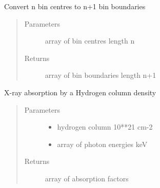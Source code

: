 \documentclass[letterpaper,10pt,english]{sphinxmanual}
\begin{document}
\begin{fulllineitems}
\end{fulllineitems}


\begin{fulllineitems}
\label{\detokenize{astro_functions:astro.ctob}}
Convert n bin centres to n+1 bin boundaries
\begin{quote}\begin{description}
\item[{Parameters}] \leavevmode
{} \textendash{} array of bin centres length n

\item[{Returns}] \leavevmode
array of bin boundaries length n+1

\end{description}\end{quote}

\end{fulllineitems}


\begin{fulllineitems}
\label{\detokenize{astro_functions:astro.habs}}
X-ray absorption by a Hydrogen column density
\begin{quote}\begin{description}
\item[{Parameters}] \leavevmode\begin{itemize}
\item {} 
 \textendash{} hydrogen column 10**21 cm-2

\item {} 
 \textendash{} array of photon energies keV

\end{itemize}

\item[{Returns}] \leavevmode
array of absorption factors

\end{description}\end{quote}

\end{fulllineitems}
\end{document}
